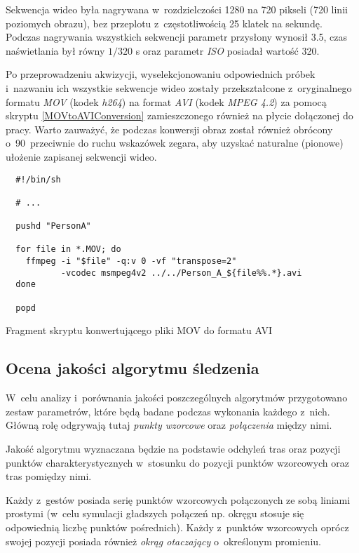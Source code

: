       Sekwencja wideo była nagrywana w~rozdzielczości 1280 na 720 pikseli (720 linii poziomych obrazu), bez przeplotu z~częstotliwością 25 klatek na sekundę. Podczas nagrywania wszystkich sekwencji parametr przysłony wynosił 3.5, czas naświetlania był równy $1/320$ s oraz parametr \textit{ISO} posiadał wartość 320.

      Po przeprowadzeniu akwizycji, wyselekcjonowaniu odpowiednich próbek i~nazwaniu ich wszystkie sekwencje wideo zostały przekształcone z~oryginalnego formatu \textit{MOV} (kodek \textit{h264}) na format \textit{AVI} (kodek \textit{MPEG 4.2}) za pomocą skryptu \ref{MOVtoAVIConversion} zamieszczonego również na płycie dołączonej do pracy. Warto zauważyć, że podczas konwersji obraz został również obrócony o~90\degree~przeciwnie do ruchu wskazówek zegara, aby uzyskać naturalne (pionowe) ułożenie zapisanej sekwencji wideo.

        \begin{sample}[ht]
          \begin{verbatim}
  #!/bin/sh

  # ...

  pushd "PersonA"

  for file in *.MOV; do
    ffmpeg -i "$file" -q:v 0 -vf "transpose=2"
           -vcodec msmpeg4v2 ../../Person_A_${file%%.*}.avi
  done

  popd
          \end{verbatim}
          \caption{Fragment skryptu konwertującego pliki MOV do formatu AVI}
          \label{MOVtoAVIConversion}
        \end{sample}

    \subsection{Ocena jakości algorytmu śledzenia}\label{Subsection_Jakosc}

      W~celu analizy i~porównania jakości poszczególnych algorytmów przygotowano zestaw parametrów, które będą badane podczas wykonania każdego z~nich. Główną rolę odgrywają tutaj \textit{punkty wzorcowe} oraz \textit{połączenia} między nimi.

      Jakość algorytmu wyznaczana będzie na podstawie odchyleń tras oraz pozycji punktów charakterystycznych w~stosunku do pozycji punktów wzorcowych oraz tras pomiędzy nimi.

      Każdy z~gestów posiada serię punktów wzorcowych połączonych ze sobą liniami prostymi (w~celu symulacji gładszych połączeń np. okręgu stosuje się odpowiednią liczbę punktów pośrednich). Każdy z~punktów wzorcowych oprócz swojej pozycji posiada również \textit{okrąg otaczający} o~określonym promieniu.

